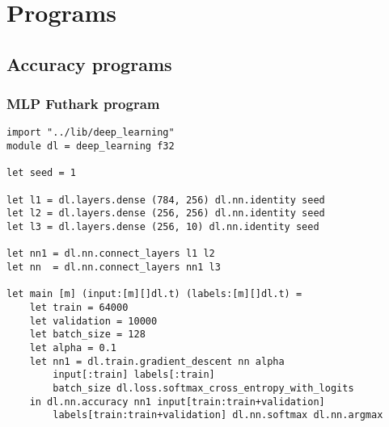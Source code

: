 \chapter{Programs}
\section{Accuracy programs}
\label{acc}
\subsection{MLP Futhark program}
\begin{lstlisting}
import "../lib/deep_learning"
module dl = deep_learning f32

let seed = 1

let l1 = dl.layers.dense (784, 256) dl.nn.identity seed
let l2 = dl.layers.dense (256, 256) dl.nn.identity seed
let l3 = dl.layers.dense (256, 10) dl.nn.identity seed

let nn1 = dl.nn.connect_layers l1 l2
let nn  = dl.nn.connect_layers nn1 l3

let main [m] (input:[m][]dl.t) (labels:[m][]dl.t) =
	let train = 64000
	let validation = 10000
	let batch_size = 128
	let alpha = 0.1
	let nn1 = dl.train.gradient_descent nn alpha
		input[:train] labels[:train]
		batch_size dl.loss.softmax_cross_entropy_with_logits
	in dl.nn.accuracy nn1 input[train:train+validation]
		labels[train:train+validation] dl.nn.softmax dl.nn.argmax
\end{lstlisting}

